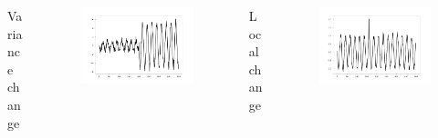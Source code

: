 \documentclass[intlimits, 9pt, unicode]{beamer}
\begin{document}
\begin{frame}
\begin{columns}
\begin{column}{0.5\textwidth}
  \begin{columns}
      \begin{column}{0.3\textwidth}
      \centering
      Variance change
      \end{column}
      \begin{column}{0.5\textwidth}
      \begin{figure}
		\includegraphics[scale=0.08]{images/examples_variance}
	\end{figure}
	\end{column}
     \end{columns}

	\end{column}

 \begin{column}{0.5\textwidth}

  \begin{columns}
      \begin{column}{0.3\textwidth}
      \centering
      Local change
      \end{column}
      \begin{column}{0.5\textwidth}
      \begin{figure}
		\includegraphics[scale=0.08]{images/examples_outlier}
	\end{figure}
	\end{column}
     \end{columns}


\end{column}
\end{columns}
\end{frame}
\end{document}

